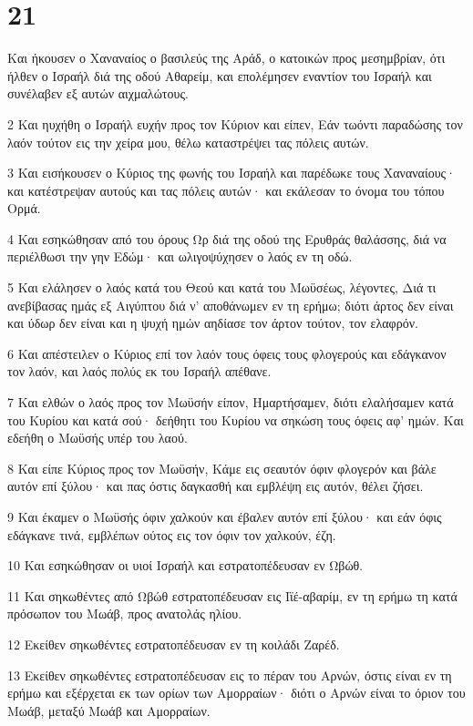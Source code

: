 \chapter{21}

\par Και ήκουσεν ο Χαναναίος ο βασιλεύς της Αράδ, ο κατοικών προς μεσημβρίαν, ότι ήλθεν ο Ισραήλ διά της οδού Αθαρείμ, και επολέμησεν εναντίον του Ισραήλ και συνέλαβεν εξ αυτών αιχμαλώτους.
\par 2 Και ηυχήθη ο Ισραήλ ευχήν προς τον Κύριον και είπεν, Εάν τωόντι παραδώσης τον λαόν τούτον εις την χείρα μου, θέλω καταστρέψει τας πόλεις αυτών.
\par 3 Και εισήκουσεν ο Κύριος της φωνής του Ισραήλ και παρέδωκε τους Χαναναίους· και κατέστρεψαν αυτούς και τας πόλεις αυτών· και εκάλεσαν το όνομα του τόπου Ορμά.
\par 4 Και εσηκώθησαν από του όρους Ωρ διά της οδού της Ερυθράς θαλάσσης, διά να περιέλθωσι την γην Εδώμ· και ωλιγοψύχησεν ο λαός εν τη οδώ.
\par 5 Και ελάλησεν ο λαός κατά του Θεού και κατά του Μωϋσέως, λέγοντες, Διά τι ανεβίβασας ημάς εξ Αιγύπτου διά ν' αποθάνωμεν εν τη ερήμω; διότι άρτος δεν είναι και ύδωρ δεν είναι και η ψυχή ημών αηδίασε τον άρτον τούτον, τον ελαφρόν.
\par 6 Και απέστειλεν ο Κύριος επί τον λαόν τους όφεις τους φλογερούς και εδάγκανον τον λαόν, και λαός πολύς εκ του Ισραήλ απέθανε.
\par 7 Και ελθών ο λαός προς τον Μωϋσήν είπον, Ημαρτήσαμεν, διότι ελαλήσαμεν κατά του Κυρίου και κατά σού· δεήθητι του Κυρίου να σηκώση τους όφεις αφ' ημών. Και εδεήθη ο Μωϋσής υπέρ του λαού.
\par 8 Και είπε Κύριος προς τον Μωϋσήν, Κάμε εις σεαυτόν όφιν φλογερόν και βάλε αυτόν επί ξύλου· και πας όστις δαγκασθή και εμβλέψη εις αυτόν, θέλει ζήσει.
\par 9 Και έκαμεν ο Μωϋσής όφιν χαλκούν και έβαλεν αυτόν επί ξύλου· και εάν όφις εδάγκανε τινά, εμβλέπων ούτος εις τον όφιν τον χαλκούν, έζη.
\par 10 Και εσηκώθησαν οι υιοί Ισραήλ και εστρατοπέδευσαν εν Ωβώθ.
\par 11 Και σηκωθέντες από Ωβώθ εστρατοπέδευσαν εις Ιϊέ-αβαρίμ, εν τη ερήμω τη κατά πρόσωπον του Μωάβ, προς ανατολάς ηλίου.
\par 12 Εκείθεν σηκωθέντες εστρατοπέδευσαν εν τη κοιλάδι Ζαρέδ.
\par 13 Εκείθεν σηκωθέντες εστρατοπέδευσαν εις το πέραν του Αρνών, όστις είναι εν τη ερήμω και εξέρχεται εκ των ορίων των Αμορραίων· διότι ο Αρνών είναι το όριον του Μωάβ, μεταξύ Μωάβ και Αμορραίων.
